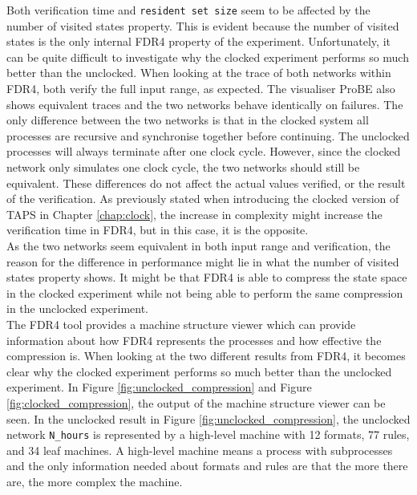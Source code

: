 Both verification time and \texttt{resident set size} seem to be affected by the number of visited states property. This is evident because the
number of visited states is the only internal FDR4 property of the experiment. Unfortunately, it can be quite difficult to investigate why the clocked experiment performs so much better than the unclocked. When looking at the trace of both networks within FDR4, both verify the full input range, as expected. The visualiser ProBE also shows equivalent traces and the two networks behave identically on failures. The only difference between the two networks is that in the clocked system all processes are recursive and synchronise together before continuing. The unclocked processes will always terminate after one clock cycle. However, since the clocked network only simulates one clock cycle, the two networks should still be equivalent. These differences do not affect the actual values verified, or the result of the verification. As previously stated when introducing the clocked version of TAPS in Chapter \ref{chap:clock}, the increase in complexity might increase the verification time in FDR4, but in this case, it is the opposite. \\

As the two networks seem equivalent in both input range and verification, the reason for the difference in performance might lie in what the number of visited states property shows. It might be that FDR4 is able to compress the state space in the clocked experiment while not being able to perform the same compression in the unclocked experiment. \\

The FDR4 tool provides a machine structure viewer which can provide information about how FDR4 represents the processes and how effective the compression is. When looking at the two different results from FDR4, it becomes clear why the clocked experiment performs so much better than the unclocked experiment. In Figure \ref{fig:unclocked_compression} and Figure \ref{fig:clocked_compression}, the output of the machine structure viewer can be seen. In the unclocked result in Figure \ref{fig:unclocked_compression}, the unclocked network
\texttt{N\_hours} is represented by a high-level machine with 12 formats, 77 rules, and 34 leaf machines. A high-level machine means a process with subprocesses and the only information needed about formats and rules are that the more there are, the more complex the machine. \\

